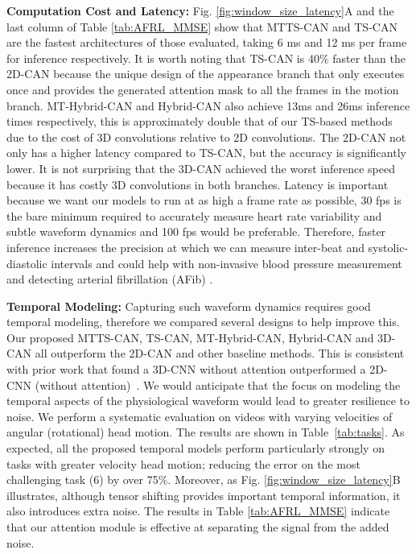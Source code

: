 \documentclass{article}
\begin{document}
\textbf{Computation Cost and Latency:} 
Fig. \ref{fig:window_size_latency}A and the last column of Table \ref{tab:AFRL_MMSE} show that MTTS-CAN and TS-CAN are the fastest architectures of those evaluated, taking 6 ms and 12 ms per frame for inference respectively. It is worth noting that TS-CAN is 40\% faster than the 2D-CAN because the unique design of the appearance branch that only executes once and provides the generated attention mask to all the frames in the motion branch.
MT-Hybrid-CAN and Hybrid-CAN also achieve 13ms and 26ms inference times respectively, this is approximately double that of our TS-based methods due to the cost of 3D convolutions relative to 2D convolutions. The 2D-CAN not only has a higher latency compared to TS-CAN, but the accuracy is significantly lower. It is not surprising that the 3D-CAN achieved the worst inference speed because it has costly 3D convolutions in both branches. Latency is important because we want our models to run at as high a frame rate as possible, 30 fps is the bare minimum required to accurately measure heart rate variability and subtle waveform dynamics and 100 fps would be preferable. Therefore, faster inference increases the precision at which we can measure inter-beat and systolic-diastolic intervals \citep{mcduff2014remote} and could help with non-invasive
blood pressure measurement \citep{hosanee2020cuffless} and detecting arterial fibrillation (AFib) \citep{chan2016diagnostic}.

\textbf{Temporal Modeling:} 
Capturing such waveform dynamics requires good temporal modeling, therefore we compared several designs to help improve this. Our proposed MTTS-CAN, TS-CAN, MT-Hybrid-CAN, Hybrid-CAN and 3D-CAN all outperform the 2D-CAN and other baseline methods. This is consistent with prior work that found a 3D-CNN without attention outperformed a 2D-CNN (without attention)~\citep{yu2019remote}. We would anticipate that the focus on modeling the temporal aspects of the physiological waveform would lead to greater resilience to noise. We perform a systematic evaluation on videos with varying velocities of angular (rotational) head motion. The results are shown in Table~\ref{tab:tasks}. As expected, all the proposed temporal models perform particularly strongly on tasks with greater velocity head motion; reducing the error on the most challenging task (6) by over 75\%. Moreover, as Fig. \ref{fig:window_size_latency}B illustrates, although tensor shifting provides important temporal information, it also introduces extra noise. The results in Table \ref{tab:AFRL_MMSE} indicate that our attention module is effective at separating the signal from the added noise.
\end{document}
